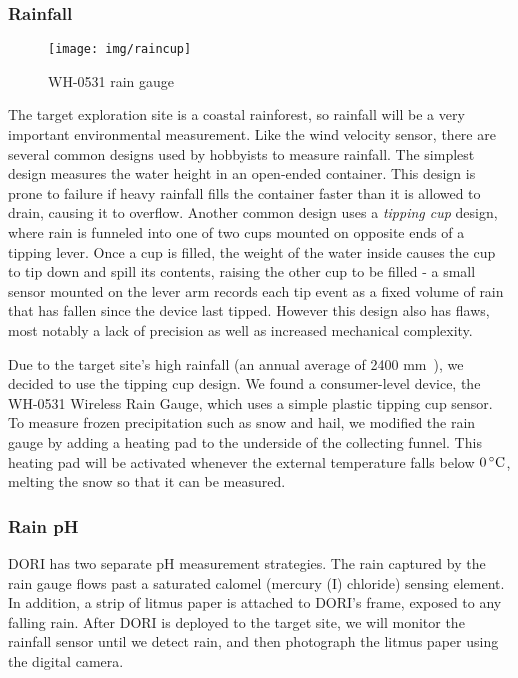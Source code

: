     \subsubsection*{Rainfall}
    \begin{wrapfigure}{l}{0.3\textwidth}
        \centering
        \texttt{[image: img/raincup]}
        \caption*{WH-0531 rain gauge}
    \end{wrapfigure}
The target exploration site is a coastal rainforest, so rainfall will be a very important environmental measurement. Like the wind velocity sensor, there are several common designs used by hobbyists to measure rainfall. The simplest design measures the water height in an open-ended container. This design is prone to failure if heavy rainfall fills the container faster than it is allowed to drain, causing it to overflow. Another common design uses a \textit{tipping cup} design, where rain is funneled into one of two cups mounted on opposite ends of a tipping lever. Once a cup is filled, the weight of the water inside causes the cup to tip down and spill its contents, raising the other cup to be filled - a small sensor mounted on the lever arm records each tip event as a fixed volume of rain that has fallen since the device last tipped. However this design also has flaws, most notably a lack of precision as well as increased mechanical complexity.

Due to the target site's high rainfall (an annual average of 2400 mm~\cite{rainfall}), we decided to use the tipping cup design. We found a consumer-level device, the \textsc{WH-0531} Wireless Rain Gauge, which uses a simple plastic tipping cup sensor. To measure frozen precipitation such as snow and hail, we modified the rain gauge by adding a heating pad to the underside of the collecting funnel. This heating pad will be activated whenever the external temperature falls below $0\,^{\circ}\mathrm{C}{}$, melting the snow so that it can be measured.


    \subsubsection*{Rain pH}
DORI has two separate pH measurement strategies. The rain captured by the rain gauge flows past a saturated calomel (mercury (I) chloride) sensing element. In addition, a strip of litmus paper is attached to DORI's frame, exposed to any falling rain. After DORI is deployed to the target site, we will monitor the rainfall sensor until we detect rain, and then photograph the litmus paper using the digital camera.

